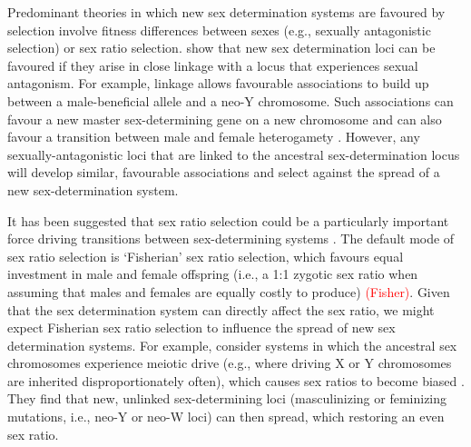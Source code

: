 \documentclass[12pt]{article}
\begin{document}


Predominant theories in which new sex determination systems are favoured by selection involve fitness differences between sexes (e.g., sexually antagonistic selection) or sex ratio selection.
\citet{vanDoorn:2007eu,vanDoorn:2010hu} show that new sex determination loci can be favoured if they arise in close linkage with a locus that experiences sexual antagonism. 
For example, linkage allows favourable associations to build up between a male-beneficial allele and a neo-Y chromosome. 
Such associations can favour a new master sex-determining gene on a new chromosome \citep{vanDoorn:2007eu} and can also favour a transition between male and female heterogamety \citep[e.g., a ZW to XY transition,][]{vanDoorn:2010hu}.
However, any sexually-antagonistic loci that are linked to the ancestral sex-determination locus will develop similar, favourable associations and select against the spread of a new sex-determination system. 

It has been suggested that sex ratio selection could be a particularly important force driving transitions between sex-determining systems \citep[Chapter 7]{Beukeboom:2014vb}. 
The default mode of sex ratio selection is `Fisherian' sex ratio selection, which favours equal investment in male and female offspring (i.e., a 1:1 zygotic sex ratio when assuming that males and females are equally costly to produce)  \textcolor{red}{(Fisher)}. 
Given that the sex determination system can directly affect the sex ratio, we might expect Fisherian sex ratio selection to influence the spread of new sex determination systems. 
For example, \citet{Kozielska:2010vm} consider systems in which the ancestral sex chromosomes experience meiotic drive (e.g., where driving X or Y chromosomes are inherited disproportionately often), which causes sex ratios to become biased \citep{Hamilton:1967ts}. 
They find that new, unlinked sex-determining loci (masculinizing or feminizing mutations, i.e., neo-Y or neo-W loci) can then spread, which restoring an even sex ratio. 
\end{document}
